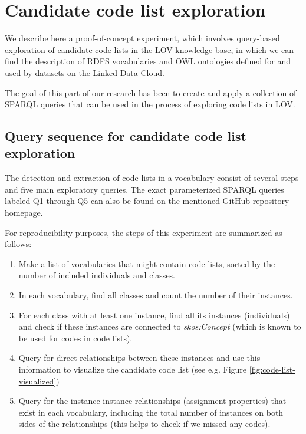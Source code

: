 \section{Candidate code list exploration} 
\label{s:codelistanalyzer}

We describe here a proof-of-concept experiment, which involves query-based exploration of candidate code lists in the LOV knowledge base, in which we can find the description of RDFS vocabularies and OWL ontologies defined for and used by datasets on the Linked Data Cloud.

The goal of this part of our research has been to create and apply a collection of SPARQL queries that can be used in the process of exploring code lists in LOV. %

\subsection{Query sequence for candidate code list exploration}
The detection and extraction of code lists in a vocabulary consist of several steps and five main exploratory queries. The exact parameterized SPARQL queries labeled Q1 through Q5 can also be found on the mentioned GitHub repository homepage.

For reproducibility purposes, the steps of this experiment are summarized as follows:

\begin{enumerate}
    \item Make a list of vocabularies that might contain code lists, sorted by the number of included individuals and classes.

    \item In each vocabulary, find all classes and count the number of their instances.%

    \item For each class with at least one instance, find all its instances (individuals) and check if these instances are connected to \emph{skos:Concept} (which is known to be used for codes in code lists).

    \item Query for direct relationships between these instances and use this information to visualize the candidate code list (see e.g. Figure \ref{fig:code-list-visualized})

    \item Query for the instance-instance relationships (assignment properties) that exist in each vocabulary, including the total number of instances on both sides of the relationships (this helps to check if we missed any codes).

\end{enumerate}

